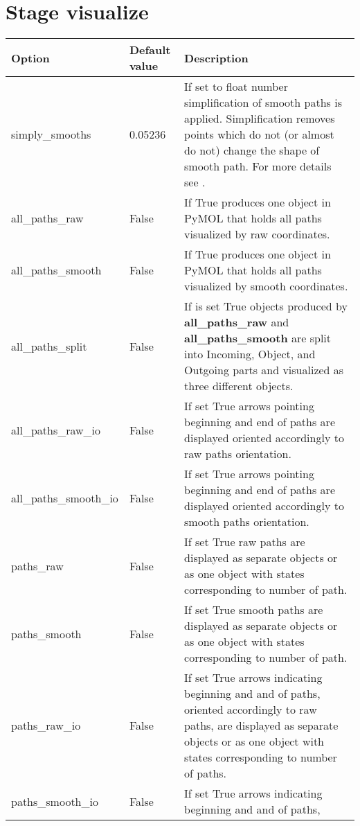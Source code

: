 \documentclass[a4paper,10pt,english]{sphinxmanual}
\begin{document}
\section{Stage \textbf{visualize}}
\label{valve/valve_config:stage-visualize}
\begin{tabulary}{\linewidth}{|L|L|L|}
\hline
\textsf{\relax 
Option
} & \textsf{\relax 
Default value
} & \textsf{\relax 
Description
}\\
\hline
simply\_smooths
 & 
0.05236
 & 
If set to float number simplification of smooth paths is
applied. Simplification removes points which do not (or almost
do not) change the shape of smooth path. For more details see
{\hyperref[aqueduct.geom.traces:simply\string-smooths\string-details]{}}.
\\
\hline
all\_paths\_raw
 & 
False
 & 
If True produces one object in PyMOL that holds all paths
visualized by raw coordinates.
\\
\hline
all\_paths\_smooth
 & 
False
 & 
If True produces one object in PyMOL that holds all paths
visualized by smooth coordinates.
\\
\hline
all\_paths\_split
 & 
False
 & 
If is set True objects produced by \textbf{all\_paths\_raw} and
\textbf{all\_paths\_smooth} are split into Incoming, Object, and
Outgoing parts and visualized as three different objects.
\\
\hline
all\_paths\_raw\_io
 & 
False
 & 
If set True arrows pointing beginning and end of paths are
displayed oriented accordingly to raw paths orientation.
\\
\hline
all\_paths\_smooth\_io
 & 
False
 & 
If set True arrows pointing beginning and end of paths are
displayed oriented accordingly to smooth paths orientation.
\\
\hline
paths\_raw
 & 
False
 & 
If set True raw paths are displayed as separate objects or as
one object with states corresponding to number of path.
\\
\hline
paths\_smooth
 & 
False
 & 
If set True smooth paths are displayed as separate objects or
as one object with states corresponding to number of path.
\\
\hline
paths\_raw\_io
 & 
False
 & 
If set True arrows indicating beginning and and of paths,
oriented accordingly to raw paths, are displayed as separate
objects or as one object with states corresponding to number
of paths.
\\
\hline
paths\_smooth\_io
 & 
False
 & 
If set True arrows indicating beginning and and of paths,

\end{tabulary}
\end{document}
